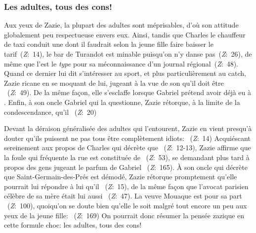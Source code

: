 \subsubsection{Les adultes, tous des cons!}
Aux yeux de Zazie, la plupart des adultes sont méprisables, d'où son attitude globalement peu respectueuse envers eux.
Ainsi, tandis que Charles le chauffeur de taxi conduit une  dont il faudrait selon la jeune fille faire baisser le tarif~(\textit{Z}:~14), le bar de Turandot est minable puisqu'on n'y danse pas~(\textit{Z}:~26), de même que l'est le \textit{type} pour sa méconnaissance d'un journal régional~(\textit{Z}:~48).
Quand ce dernier lui dit s'intéresser au sport, et plus particulièrement au catch, Zazie ricane en se moquant de lui, jugeant à la vue de son  qu'il doit être ~(\textit{Z}:~49).
De la même façon, elle s'esclaffe lorsque Gabriel prétend avoir déjà eu à .
Enfin, à son oncle Gabriel qui la questionne, Zazie rétorque, à la limite de la condescendance, qu'il ~(\textit{Z}:~20)
\par
Devant la déraison généralisée des adultes qui l'entourent, Zazie en vient presqu'à douter qu'ils puissent ne pas tous être complètement idiots: ~(\textit{Z}:~14)
Acquiéscant sereinement aux propos de Charles qui décrète que ~(\textit{Z}:~12-13), Zazie affirme que la foule qui fréquente la rue est constituée de ~(\textit{Z}:~53), se demandant plus tard à propos des gens jugeant le parfum de Gabriel ~(\textit{Z}:~165).
À son oncle qui décrète que Saint-Germain-des-Prés est démodé, Zazie rétorque promptement qu'elle pourrait lui répondre à lui qu'il ~(\textit{Z}:~15), de la même façon que l'avocat parisien célèbre de sa mère était lui aussi ~(\textit{Z}:~47).
La veuve Mouaque est pour sa part ~(\textit{Z}:~100), quoiqu'on se doute bien qu'elle le soit malgré tout encore un peu aux yeux de la jeune fille: ~(\textit{Z}:~169)
On pourrait donc résumer la pensée zazique en cette formule choc: les adultes, tous des cons!
\par
